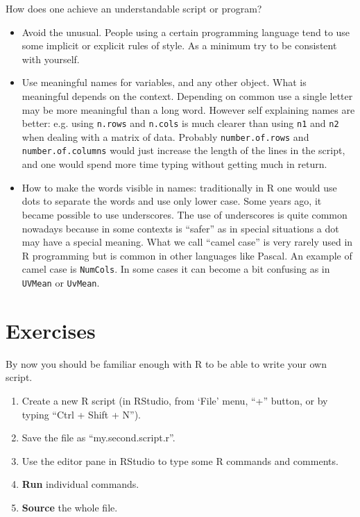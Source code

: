 \documentclass[paper=a4,10pt,div=17,headsepline,BCOR=12mm,twoside,open=right]{scrbook}\usepackage{knitr}
\begin{document}
How does one achieve an understandable script or program?
\begin{itemize}
  \item Avoid the unusual. People using a certain programming language tend to use some implicit or explicit rules of style. As a minimum try to be consistent with yourself.
  \item Use meaningful names for variables, and any other object. What is meaningful depends on the context. Depending on common use a single letter may be more meaningful than a long word. However self explaining names are better: e.g. using \texttt{n.rows} and \texttt{n.cols} is much clearer than using \texttt{n1} and \texttt{n2} when dealing with a matrix of data. Probably \texttt{number.of.rows} and \texttt{number.of.columns} would just increase the length of the lines in the script, and one would spend more time typing without getting much in return.
  \item How to make the words visible in names: traditionally in R one would use dots to separate the words and use only lower case. Some years ago, it became possible to use underscores. The use of underscores is quite common nowadays because in some contexts is ``safer'' as in special situations a dot may have a special meaning. What we call ``camel case'' is very rarely used in R programming but is common in other languages like Pascal. An example of camel case is \texttt{NumCols}. In some cases it can become a bit confusing as in \texttt{UVMean} or \texttt{UvMean}.
\end{itemize}

\section{Exercises}

By now you should be familiar enough with R to be able to write your own script.
\begin{enumerate}
  \item Create a new R script (in RStudio, from `File' menu, ``+'' button, or by typing ``Ctrl + Shift + N'').
  \item Save the file as ``my.second.script.r''.
  \item Use the editor pane in RStudio to type some R commands and comments.
  \item \textbf{Run} individual commands.
  \item \textbf{Source} the whole file.
\end{enumerate}
\end{document}
